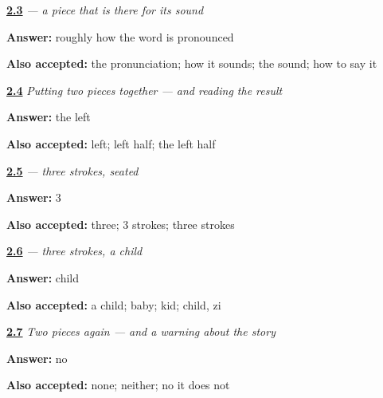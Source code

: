 \noindent\begin{minipage}[t]{\linewidth}
\raggedright
\hyperlink{review-ZH-W01-er-role}{\textbf{2.3}} \emph{ — a piece that is there for its sound}\par
\small \textbf{Answer:} roughly how the word is pronounced\par
\footnotesize \textbf{Also accepted:} the pronunciation; how it sounds; the sound; how to say it
\end{minipage}\par\medskip

\noindent\begin{minipage}[t]{\linewidth}
\raggedright
\hyperlink{review-ZH-W01-ni-build-halves}{\textbf{2.4}} \emph{Putting two pieces together — and reading the result}\par
\small \textbf{Answer:} the left\par
\footnotesize \textbf{Also accepted:} left; left half; the left half
\end{minipage}\par\medskip

\noindent\begin{minipage}[t]{\linewidth}
\raggedright
\hyperlink{review-ZH-W01-nu-strokes}{\textbf{2.5}} \emph{ — three strokes, seated}\par
\small \textbf{Answer:} 3\par
\footnotesize \textbf{Also accepted:} three; 3 strokes; three strokes
\end{minipage}\par\medskip

\noindent\begin{minipage}[t]{\linewidth}
\raggedright
\hyperlink{review-ZH-W01-zi-meaning}{\textbf{2.6}} \emph{ — three strokes, a child}\par
\small \textbf{Answer:} child\par
\footnotesize \textbf{Also accepted:} a child; baby; kid; child, zi
\end{minipage}\par\medskip

\noindent\begin{minipage}[t]{\linewidth}
\raggedright
\hyperlink{review-ZH-W01-hao-build-halves}{\textbf{2.7}} \emph{Two pieces again — and a warning about the story}\par
\small \textbf{Answer:} no\par
\footnotesize \textbf{Also accepted:} none; neither; no it does not
\end{minipage}\par\medskip

